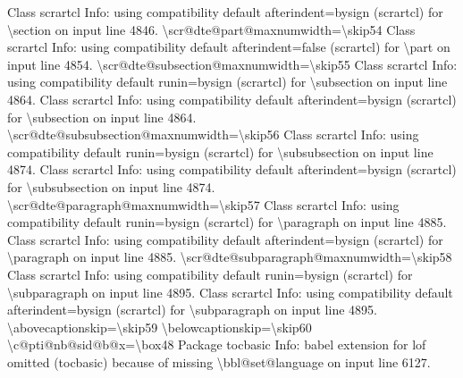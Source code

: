 \documentclass[
  letterpaper,
  DIV=11,
  numbers=noendperiod]{scrartcl}
\newenvironment{Shaded}{\begin{snugshade}}{\end{snugshade}}
\newcommand{\NormalTok}[1]{\textcolor[rgb]{0.00,0.23,0.31}{#1}}
\begin{document}
\begin{Shaded}
\begin{Highlighting}[]
\NormalTok{Class scrartcl Info: using compatibility default \textasciigrave{}afterindent=bysign\textquotesingle{}}
\NormalTok{(scrartcl)           for \textasciigrave{}\textbackslash{}section on input line 4846.}
\NormalTok{\textbackslash{}scr@dte@part@maxnumwidth=\textbackslash{}skip54}
\NormalTok{Class scrartcl Info: using compatibility default \textasciigrave{}afterindent=false\textquotesingle{}}
\NormalTok{(scrartcl)           for \textasciigrave{}\textbackslash{}part on input line 4854.}
\NormalTok{\textbackslash{}scr@dte@subsection@maxnumwidth=\textbackslash{}skip55}
\NormalTok{Class scrartcl Info: using compatibility default \textasciigrave{}runin=bysign\textquotesingle{}}
\NormalTok{(scrartcl)           for \textasciigrave{}\textbackslash{}subsection on input line 4864.}
\NormalTok{Class scrartcl Info: using compatibility default \textasciigrave{}afterindent=bysign\textquotesingle{}}
\NormalTok{(scrartcl)           for \textasciigrave{}\textbackslash{}subsection on input line 4864.}
\NormalTok{\textbackslash{}scr@dte@subsubsection@maxnumwidth=\textbackslash{}skip56}
\NormalTok{Class scrartcl Info: using compatibility default \textasciigrave{}runin=bysign\textquotesingle{}}
\NormalTok{(scrartcl)           for \textasciigrave{}\textbackslash{}subsubsection on input line 4874.}
\NormalTok{Class scrartcl Info: using compatibility default \textasciigrave{}afterindent=bysign\textquotesingle{}}
\NormalTok{(scrartcl)           for \textasciigrave{}\textbackslash{}subsubsection on input line 4874.}
\NormalTok{\textbackslash{}scr@dte@paragraph@maxnumwidth=\textbackslash{}skip57}
\NormalTok{Class scrartcl Info: using compatibility default \textasciigrave{}runin=bysign\textquotesingle{}}
\NormalTok{(scrartcl)           for \textasciigrave{}\textbackslash{}paragraph on input line 4885.}
\NormalTok{Class scrartcl Info: using compatibility default \textasciigrave{}afterindent=bysign\textquotesingle{}}
\NormalTok{(scrartcl)           for \textasciigrave{}\textbackslash{}paragraph on input line 4885.}
\NormalTok{\textbackslash{}scr@dte@subparagraph@maxnumwidth=\textbackslash{}skip58}
\NormalTok{Class scrartcl Info: using compatibility default \textasciigrave{}runin=bysign\textquotesingle{}}
\NormalTok{(scrartcl)           for \textasciigrave{}\textbackslash{}subparagraph on input line 4895.}
\NormalTok{Class scrartcl Info: using compatibility default \textasciigrave{}afterindent=bysign\textquotesingle{}}
\NormalTok{(scrartcl)           for \textasciigrave{}\textbackslash{}subparagraph on input line 4895.}
\NormalTok{\textbackslash{}abovecaptionskip=\textbackslash{}skip59}
\NormalTok{\textbackslash{}belowcaptionskip=\textbackslash{}skip60}
\NormalTok{\textbackslash{}c@pti@nb@sid@b@x=\textbackslash{}box48}
\NormalTok{Package tocbasic Info: babel extension for \textasciigrave{}lof\textquotesingle{} omitted}
\NormalTok{(tocbasic)             because of missing \textbackslash{}bbl@set@language on input line 6127.}


\end{Highlighting}
\end{Shaded}
\end{document}
